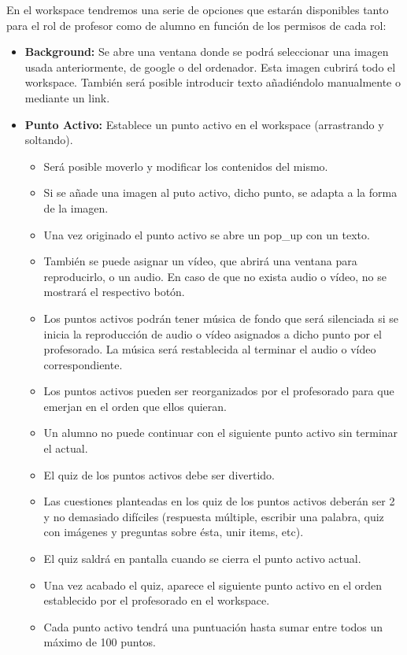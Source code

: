\documentclass[12pt,letterpaper]{article}
\begin{document}
En el workspace tendremos una serie de opciones que estarán disponibles tanto para el rol de profesor como de alumno en función de los permisos de cada rol:
\begin{itemize}
	\item \textbf{Background:} Se abre una ventana donde se podrá seleccionar una imagen usada anteriormente, de google o del ordenador. Esta imagen cubrirá todo el workspace. También será posible introducir texto añadiéndolo manualmente o mediante un link.
	\item \textbf{Punto Activo:} Establece un punto activo en el workspace (arrastrando y soltando).
	\begin{itemize}
		\item Será posible moverlo y modificar los contenidos del mismo.
		\item Si se añade una imagen al puto activo, dicho punto, se adapta a la forma de la imagen.
		\item Una vez originado el punto activo se abre un pop\_up con un texto.
		\item También se puede asignar un vídeo, que abrirá una ventana para reproducirlo, o un audio. En caso de que no exista audio o vídeo, no se mostrará el respectivo botón.
		\item Los puntos activos podrán tener música de fondo que será silenciada si se inicia la reproducción de audio o vídeo asignados a dicho punto por el profesorado. La música será restablecida al terminar el audio o vídeo correspondiente.
		\item Los puntos activos pueden ser reorganizados por el profesorado para que emerjan en el orden que ellos quieran.
		\item Un alumno no puede continuar con el siguiente punto activo sin terminar el actual.
		\item El quiz de los puntos activos debe ser divertido.
		\item Las cuestiones planteadas en los quiz de los puntos activos deberán ser 2 y no demasiado difíciles (respuesta múltiple, escribir una palabra, quiz con imágenes y preguntas sobre ésta, unir items, etc).
		\item El quiz saldrá en pantalla cuando se cierra el punto activo actual.
		\item Una vez acabado el quiz, aparece el siguiente punto activo en el orden establecido por el profesorado en el workspace.
		\item Cada punto activo tendrá una puntuación hasta sumar entre todos un máximo de 100 puntos.

\end{itemize}
\end{itemize}
\end{document}
